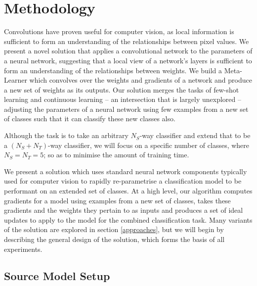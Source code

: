 \documentclass{report}
\begin{document}
\chapter{Methodology} \label{methodology}
Convolutions have proven useful for computer vision, as local information is sufficient to form an understanding of the relationships between pixel values. We present a novel solution that applies a convolutional network to the parameters of a neural network, suggesting that a local view of a network's layers is sufficient to form an understanding of the relationships between weights. We build a Meta-Learner which convolves over the weights and gradients of a network and produce a new set of weights as its outputs. Our solution merges the tasks of few-shot learning and continuous learning -- an intersection that is largely unexplored -- adjusting the parameters of a neural network using few examples from a new set of classes such that it can classify these new classes also. \par
Although the task is to take an arbitrary $N_{S}$-way classifier and extend that to be a $(N_{S}+N_{T})$-way classifier, we will focus on a specific number of classes, where $N_{S} = N_{T} = 5$; so as to minimise the amount of training time. \par
We present a solution which uses standard neural network components typically used for computer vision to rapidly re-parametrise a classification model to be performant on an extended set of classes. At a high level, our algorithm computes gradients for a model using examples from a new set of classes, takes these gradients and the weights they pertain to as inputs and produces a set of ideal updates to apply to the model for the combined classification task. Many variants of the solution are explored in section \ref{approaches}, but we will begin by describing the general design of the solution, which forms the basis of all experiments. \par

\section{Source Model Setup} \label{commonalities}
\end{document}
